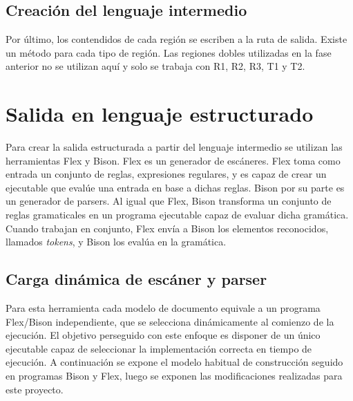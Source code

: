 



\subsection{Creación del lenguaje intermedio}

Por último, los contendidos de cada región se escriben a la ruta de salida. Existe un método para cada tipo de región. Las regiones dobles utilizadas en la fase anterior no se utilizan aquí y solo se trabaja con R1, R2, R3, T1 y T2.

\section{Salida en lenguaje estructurado}

Para crear la salida estructurada a partir del lenguaje intermedio se utilizan las herramientas Flex y Bison. Flex es un generador de escáneres. Flex toma como entrada un conjunto de reglas, expresiones regulares, y es capaz de crear un ejecutable que evalúe una entrada en base a dichas reglas. Bison por su parte es un generador de parsers. Al igual que Flex, Bison transforma un conjunto de reglas gramaticales en un programa ejecutable capaz de evaluar dicha gramática. Cuando trabajan en conjunto, Flex envía a Bison los elementos reconocidos, llamados \emph{tokens}, y Bison los evalúa en la gramática.

\subsection{Carga dinámica de escáner y parser}

Para esta herramienta cada modelo de documento equivale a un programa Flex/Bison independiente, que se selecciona dinámicamente al comienzo de la ejecución. El objetivo perseguido con este enfoque es disponer de un único ejecutable capaz de seleccionar la implementación correcta en tiempo de ejecución. A continuación se expone el modelo habitual de construcción seguido en programas Bison y Flex, luego se exponen las modificaciones realizadas para este proyecto.

